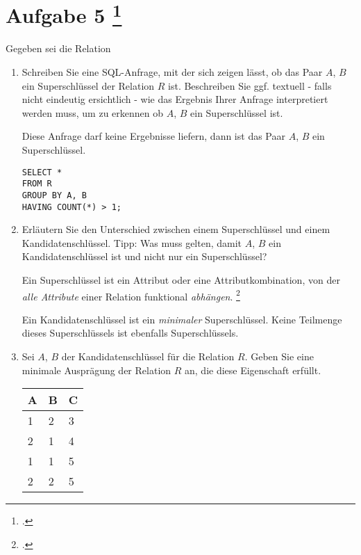 \documentclass{lehramt-informatik-aufgabe}
\begin{document}
\section{Aufgabe 5
\footcite{examen:66116:2020:03}}

Gegeben sei die Relation 

\begin{enumerate}
\item Schreiben Sie eine SQL-Anfrage, mit der sich zeigen lässt, ob das
Paar $A$, $B$ ein Superschlüssel der Relation $R$ ist. Beschreiben Sie
ggf. textuell - falls nicht eindeutig ersichtlich - wie das Ergebnis
Ihrer Anfrage interpretiert werden muss, um zu erkennen ob $A$, $B$ ein
Superschlüssel ist.

\begin{liAntwort}
Diese Anfrage darf keine Ergebnisse liefern, dann ist das Paar $A$, $B$ ein
Superschlüssel.

\begin{verbatim}
SELECT *
FROM R
GROUP BY A, B
HAVING COUNT(*) > 1;
\end{verbatim}
\end{liAntwort}

\item Erläutern Sie den Unterschied zwischen einem Superschlüssel und
einem Kandidatenschlüssel. Tipp: Was muss gelten, damit $A$, $B$ ein
Kandidatenschlüssel ist und nicht nur ein Superschlüssel?

\begin{liAntwort}
Ein Superschlüssel ist ein Attribut oder
eine Attributkombination, von der \emph{alle Attribute} einer Relation
funktional \emph{abhängen}.
\footcite[Seite 181 Kapitel 6.2 „Superschlüssel“]{kemper}

Ein Kandidatenschlüssel ist ein \emph{minimaler} Superschlüssel. Keine
Teilmenge dieses Superschlüssels ist ebenfalls Superschlüssels.

\end{liAntwort}

\item Sei $A$, $B$ der Kandidatenschlüssel für die Relation $R$. Geben
Sie eine minimale Ausprägung der Relation $R$ an, die diese Eigenschaft
erfüllt.

\begin{liAntwort}
\begin{tabular}{|l|l|l|}
\hline
A & B & C \\\hline\hline
1 & 2 & 3 \\\hline
2 & 1 & 4 \\\hline
1 & 1 & 5 \\\hline
2 & 2 & 5 \\\hline
\end{tabular}
\end{liAntwort}

\end{enumerate}
\end{document}
